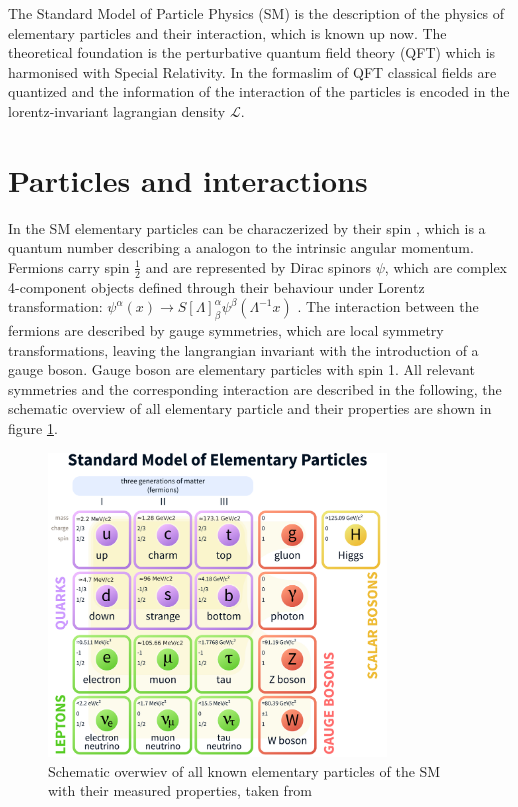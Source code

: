 The Standard Model of Particle Physics (\acs{SM}) \cite{SM} is the description of the physics of elementary particles and their interaction, which is known up now. The theoretical foundation is the perturbative quantum field theory (\acs{QFT}) which is harmonised with Special Relativity. In the formaslim of \acs{QFT} classical fields are quantized and the information of the interaction of the particles is encoded in the lorentz-invariant lagrangian density $\mathcal{L}$. 



\section{Particles and interactions}
\label{sec:section_1_1}

In the \acs{SM} elementary particles can be characzerized by their spin \cite{SPIN}, which is a quantum number describing a analogon to the intrinsic angular momentum. Fermions carry spin $\frac{1}{2}$ and are represented by Dirac spinors $\psi$, which are complex 4-component objects defined through their behaviour under Lorentz transformation: $\psi^{\alpha}(x) \rightarrow S[\Lambda]^{\alpha}_{\beta} \psi^{\beta}(\Lambda^{-1}x)$ \cite{spinor}. The interaction between the fermions are described by gauge symmetries, which are local symmetry transformations, leaving the langrangian invariant with the introduction of a gauge boson. Gauge boson are elementary particles with spin 1. All relevant symmetries and the corresponding interaction are described in the following, the schematic overview of all elementary particle and their properties are shown in figure \ref{fig:fig_1_1}.


\begin{figure}[ht]
	\centering
	\includegraphics[width=0.8\textwidth]{pictures/Standard_Model_of_Elementary_Particles.pdf}

	\caption[Schematic overwiev of Standard Model particles]{Schematic overwiev of all known elementary particles of the \acs{SM} with their measured properties, taken from \cite{SMPARTICLES}}
	\label{fig:fig_1_1}
\end{figure}


